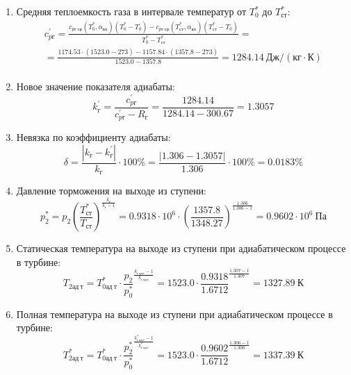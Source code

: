 \documentclass[a4paper,12pt]{article}
\begin{document}
\begin{enumerate}
        \item Средняя теплоемкость газа в интервале температур от $T_0^*$ до $T_{ст}^*$:
        \begin{gather*}
            c_{pг}^\prime = \frac{
		        c_{pг\ ср} (T_0^*, \alpha_{вх}) (T_0^* - T_0) - c_{pг\ ср} (T_{ст}^*, \alpha_{вх})(T_{ст}^* - T_0)
		    }{
		        T_0^* - T_{ст}^*} =\\
            =\frac{
		        1174.53 \cdot
                (1523.0 - 273) -
		        1157.84 \cdot
                (1357.8 - 273)
		    }{
		        1523.0 - 1357.8} =
		    1284.14 \ Дж / (кг \cdot К)\\
        \end{gather*}

        \item Новое значение показателя адиабаты:
        \[
            k_г^\prime = \frac{c_{pг}^\prime}{c_{pг}^\prime - R_г} =
                \frac{
                    1284.14
                }{
                    1284.14 - 300.67
                }
            = 1.3057
        \]

        \item Невязка по коэффициенту адиабаты:
        \[
            \delta = \frac{ \left| k_г - k_г^\prime \right| }{ k_г } \cdot 100 \%=
                \frac{
                    \left| 1.306 - 1.3057 \right|
                }{
                    1.306
                } \cdot 100 \% =
            0.0183 \%
        \]

        \item Давление торможения на выходе из ступени:
        \[
            p_2^* = p_2 \left(
                            \frac{ T_{ст}^* }{ T_{ст} }
                    \right) ^ \frac{ k_г }{ k_г - 1 } =
                 0.9318 \cdot 10^6 \cdot \left(
                            \frac{ 1357.8 }{ 1348.27 }
                    \right) ^
                \frac{ 1.306 }{ 1.306 - 1 } =
            0.9602 \cdot 10^6 \ Па
        \]

        \item Статическая температура на выходе из ступени при адиабатическом процессе в турбине:
        \[
            T_{2ад\ т} = T_{0ад\ т}^* \cdot \frac{p_2}{p_0^*} ^ {
                    \frac{k_{г\ ад\ т} - 1}{k_{г\ ад\ т} }
            } = 1523.0 \cdot
            \frac{ 0.9318
            }{
            1.6712
            } ^ {
                    \frac{1.307 - 1}{1.307}
            } =
            1327.89\ К
        \]

        \item Полная температура на выходе из ступени при адиабатическом процессе в турбине:
        \[
            T_{2ад\ т}^* = T_{0ад\ т}^* \cdot \frac{p_2^*}{p_0^*} ^ {
                    \frac{k_{г\ ад\ т}^* - 1}{k_{г\ ад\ т}^*}
            } = 1523.0 \cdot
            \frac{ 0.9602
            }{
            1.6712
            } ^ {
                    \frac{1.306 - 1}{1.306}
            } =
            1337.39\ К
        \]


\end{enumerate}
\end{document}
